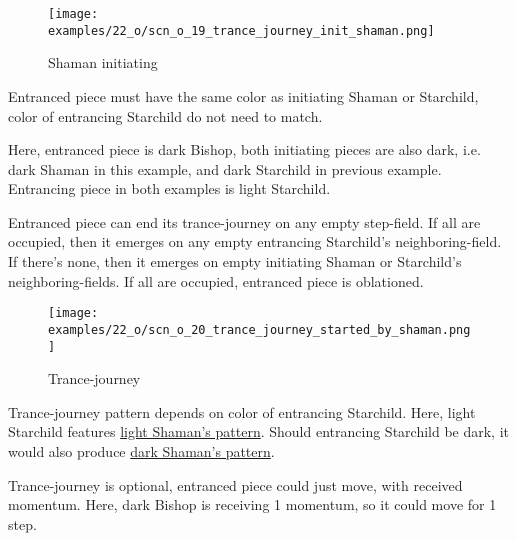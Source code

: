 \vspace*{-0.3\baselineskip}
\noindent
\begin{wrapfigure}[10]{l}{0.4\textwidth}
\centering
\texttt{[image: examples/22\_o/scn\_o\_19\_trance\_journey\_init\_shaman.png]}
\caption{Shaman initiating}
\label{fig:scn_o_19_trance_journey_init_shaman}
\end{wrapfigure}
Entranced piece must have the same color as initiating Shaman or Starchild, color of
entrancing Starchild do not need to match.

Here, entranced piece is dark Bishop, both initiating pieces are also dark, i.e. dark Shaman
in this example, and dark Starchild in previous example. Entrancing piece in both examples
is light Starchild.

Entranced piece can end its trance-journey on any empty step-field. If all are occupied, then it emerges
on any empty entrancing Starchild's neighboring-field. If there's none, then it emerges on empty initiating
Shaman or Starchild's neighboring-fields. If all are occupied, entranced piece is oblationed.

\clearpage %

\vspace*{-2.1\baselineskip}
\noindent
\begin{figure}[!h]
\texttt{[image: examples/22\_o/scn\_o\_20\_trance\_journey\_started\_by\_shaman.png]}
\caption{Trance-journey}
\label{fig:scn_o_20_trance_journey_started_by_shaman}
\end{figure}

Trance-journey pattern depends on color of entrancing Starchild. Here, light Starchild features
\hyperref[fig:scn_cot_14_light_shaman_trance_journey]{light Shaman's pattern}. Should entrancing
Starchild be dark, it would also produce
\hyperref[fig:scn_cot_16_dark_shaman_trance_journey]{dark Shaman's pattern}.

Trance-journey is optional, entranced piece could just move, with received momentum.
Here, dark Bishop is receiving 1 momentum, so it could move for 1 step.

\clearpage %

